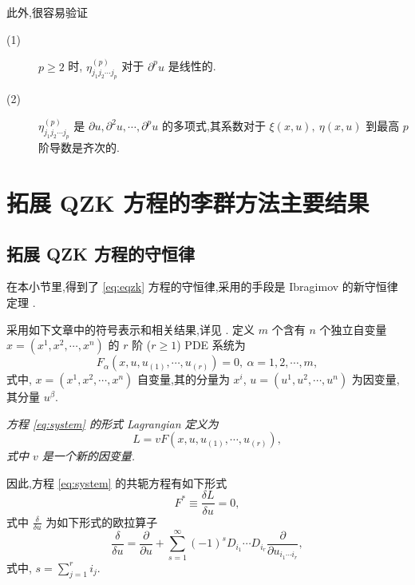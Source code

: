 此外,很容易验证
\begin{description}
	\item[(1)] $p\geq 2$ 时, $\eta_{j_1j_2\cdots j_p}^{(p)}$ 对于 $\partial^pu$ 是线性的.
	\item[(2)] $\eta_{j_1j_2\cdots j_p}^{(p)}$ 是 $\partial u,\partial^2u,\cdots,\partial^pu$ 的多项式,其系数对于 $\xi(x,u),~\eta(x,u)$ 到最高 $p$ 阶导数是齐次的.
\end{description}

\section{拓展 QZK 方程的李群方法主要结果}

\subsection{拓展 QZK 方程的守恒律}\label{sec:05con}
在本小节里,得到了 \eqref{eq:eqzk} 方程的守恒律,采用的手段是 Ibragimov 的新守恒律定理 \cite{wazwaz2012soli,yan2009per}.

采用如下文章中的符号表示和相关结果,详见 \cite{wazwaz2012soli,yan2009per,yasar2010con,zakharov1974on}. 定义 $m$ 个含有 $n$ 个独立自变量 $x=(x^1,x^2,\cdots,x^n)$ 的 $r$ 阶  ($r\geq1$) PDE 系统为
\begin{equation}\label{eq:system}
F_\alpha(x,u,u_{(1)},\cdots,u_{(r)})=0,~ \alpha=1,2,\cdots,m,
\end{equation}
式中, $x=(x^1,x^2,\cdots,x^n)$ 自变量,其的分量为 $x^i$, $u=(u^1,u^2,\cdots,u^n)$ 为因变量,其分量 $u^\beta$.

\begin{definition}[形式 Lagrangian]
	\emph{方程 \eqref{eq:system} 的形式 Lagrangian 定义为
	\begin{equation*}
		L=vF(x,u,u_{(1)},\cdots,u_{(r)}),
	\end{equation*}
	式中 $v$ 是一个新的因变量.}
\end{definition}

因此,方程 \eqref{eq:system} 的共轭方程有如下形式
\begin{equation}\label{eq:adjoint}
	F^*\equiv \frac{\delta L}{\delta u} = 0,
\end{equation}
式中 $\displaystyle \frac{\delta}{\delta u}$ 为如下形式的欧拉算子
\begin{equation*}
	\frac{\delta}{\delta u} = \frac{\partial}{\partial u}+\sum_{s=1}^{\infty}(-1)^{s}D_{i_1}\cdots D_{i_r}\frac{\partial}{\partial u_{i_1\cdots i_r}},
\end{equation*}
式中, $s=\sum_{j=1}^{r}i_j$.

